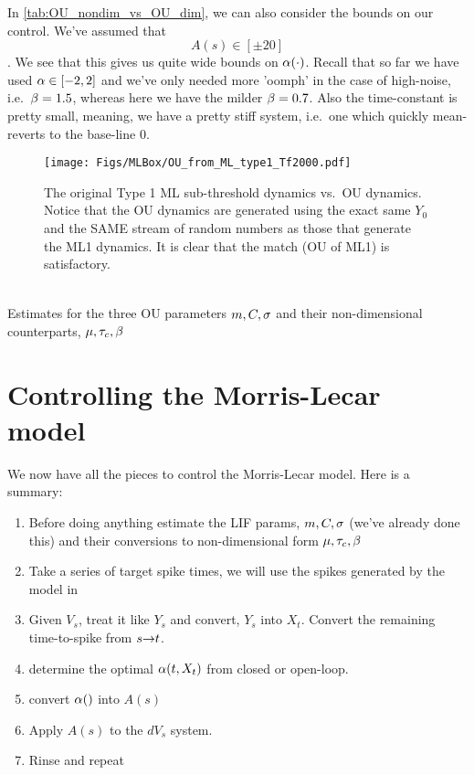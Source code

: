 \documentclass{article}
\begin{document}
In \cref{tab:OU_nondim_vs_OU_dim}, we can also consider the bounds on our
control. We've assumed that $$A(s) \in [\pm 20]$$. We see that this gives
us quite wide bounds on ${\alpha}(\cdot)$. Recall that so far we have used ${\alpha} \in
[-2,2]$ and we've only needed more 'oomph' in the case of high-noise, i.e.\
${\beta}=1.5$, whereas here we have the milder ${\beta}=0.7$. Also the time-constant is
pretty small, meaning, we have a pretty stiff system, i.e.\ one which quickly
mean-reverts to the base-line $0$.


\begin{figure}[htp]
\begin{center}
  \texttt{[image: Figs/MLBox/OU\_from\_ML\_type1\_Tf2000.pdf]}
  \caption[labelInTOC]{The original Type 1 ML sub-threshold dynamics vs.\ OU
  dynamics. Notice that the OU dynamics are generated using the exact same
  $Y_0$ and the SAME stream of random numbers as those that generate the ML1
  dynamics. It is clear that the match (OU of ML1) is satisfactory.} 
  \label{fig:OU_vs_ML1}
\end{center} 
\end{figure}

\begin{table}
\begin{align*}

\end{align*} 
\caption{Estimates for the three OU parameters $m, C, {\sigma }$ and their 
non-dimensional counterparts, $\mu , { \tau_{c} } ,\beta$} 
\label{tab:OU_nondim_vs_OU_dim}
\end{table}

\clearpage

\section{Controlling the Morris-Lecar model}
\label{sec:controlling_ML}
We now have all the pieces to control the Morris-Lecar model. Here is a summary:
\begin{enumerate}
  \item Before doing anything estimate the LIF params, $m, C, {\sigma }$ (we've
  already done this) and their conversions to non-dimensional form $\mu , { \tau_{c} }
  ,\beta$
  \item Take a series of target spike times, we will use the spikes generated by
  the model in 
  \item Given $V_s$, treat it like $Y_s$ and convert, $Y_s$ into $X_t$. Convert
  the remaining time-to-spike from $s {\rightarrow} t$. 
  \item determine the optimal ${\alpha}(t, X_t)$ from closed or open-loop. 
  \item convert ${\alpha}()$ into $A(s)$
  \item Apply $A(s)$ to the $dV_s$ system.
  \item Rinse and repeat  
\end{enumerate} 
\end{document}
